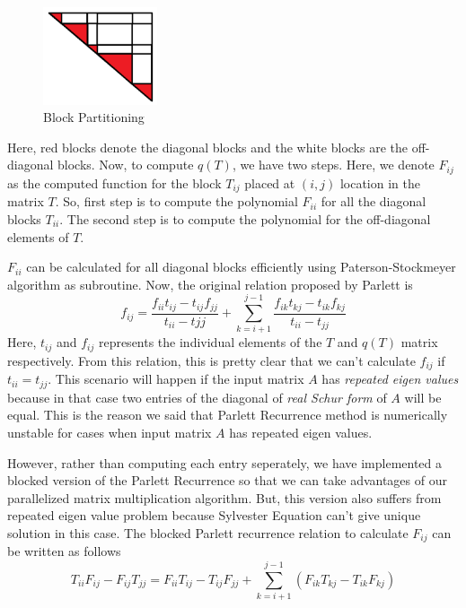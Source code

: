 \documentclass[12pt,a4paper]{article}
\begin{document}
\begin{figure}
    \centering
    \includegraphics[width=0.30\textwidth]{Blocks.png}
    \caption{Block Partitioning}
\end{figure}

Here, red blocks denote the diagonal blocks and the white blocks are the off-diagonal blocks. Now, to compute $q(T)$, we have two steps. Here, we denote $F_{ij}$ as the computed function for the block $T_{ij}$ placed at $(i, j)$ location in the matrix $T$. So, first step is to compute the polynomial $F_{ii}$ for all the diagonal blocks $T_{ii}$. The second step is to compute the polynomial for the off-diagonal elements of $T$.

$F_{ii}$ can be calculated for all diagonal blocks efficiently using Paterson-Stockmeyer algorithm as subroutine. Now, the original relation proposed by Parlett is
$$f_{ij} = \frac{f_{ii}t_{ij} - t_{ij}f_{jj}}{t_{ii} - t{jj}} + \sum_{k=i+1}^{j-1}\frac{f_{ik}t_{kj} - t_{ik}f_{kj}}{t_{ii} - t_{jj}}$$
Here, $t_{ij}$ and $f_{ij}$ represents the individual elements of the $T$ and $q(T)$ matrix respectively. From this relation, this is pretty clear that we can't calculate $f_{ij}$ if $t_{ii} = t_{jj}$. This scenario will happen if the input matrix $A$ has \textit{repeated eigen values} because in that case two entries of the diagonal of \textit{real Schur form} of $A$ will be equal. This is the reason we said that Parlett Recurrence method is numerically unstable for cases when input matrix $A$ has repeated eigen values.

However, rather than computing each entry seperately, we have implemented a blocked version of the Parlett Recurrence so that we can take advantages of our parallelized matrix multiplication algorithm. But, this version also suffers from repeated eigen value problem because Sylvester Equation can't give unique solution in this case. 
\newpage
The blocked Parlett recurrence relation to calculate $F_{ij}$ can be written as follows 
$$T_{ii}F_{ij} - F_{ij}T_{jj} = F_{ii}T_{ij} - T_{ij}F_{jj} + \sum_{k=i+1}^{j-1}(F_{ik}T_{kj} - T_{ik}F_{kj})$$ 
\end{document}
